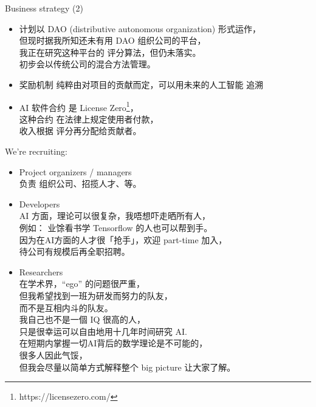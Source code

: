 \documentclass[10pt]{beamer}
\newcommand{\emp}[1]{{\color{blue}#1}}
\begin{document}
\begin{frame}
\vspace*{2em}
{\color{blue} \Large Business strategy (2)}
\vspace*{1em}
\begin{itemize}
	\item 计划以 \emp{DAO (distributive autonomous organization)} 形式运作，\\
			但现时据我所知还未有用 DAO 组织公司的平台， \\
			我正在研究这种平台的 \emp{评分算法}，但仍未落实。 \\
			初步会以传统公司的混合方法管理。
	\item 奖励机制 纯粹由对项目的贡献而定，可以用未来的人工智能 \emp{追溯}
	\item AI 软件合约 是 \emp{License Zero}\footnote{https://licensezero.com/}，\\
			这种合约 在法律上规定使用者付款，\\
			收入根据 评分再分配给贡献者。
\end{itemize}
\end{frame}


\begin{frame}
\vspace*{2em}
{\color{blue} \Large We're recruiting:}
\vspace*{1em}
\begin{itemize}
	\item \emp{Project organizers / managers} \\
		负责 组织公司、招揽人才、等。
	\item \emp{Developers} \\
		AI 方面，理论可以很复杂，我唔想吓走晒所有人，\\
		例如： 业馀看书学 Tensorflow 的人也可以帮到手。 \\
		因为在AI方面的人才很「抢手」，欢迎 part-time 加入，\\
		待公司有规模后再全职招聘。
	\item \emp{Researchers} \\
		在学术界，``ego'' 的问题很严重， \\
		但我希望找到一班为研发而努力的队友，\\
		而不是互相内斗的队友。\\
		我自己也不是一個 IQ 很高的人，\\
		只是很幸运可以自由地用十几年时间研究 AI. \\
		在短期内掌握一切AI背后的数学理论是不可能的，\\
		很多人因此气馁，\\
		但我会尽量以简单方式解释整个 big picture 让大家了解。 
\end{itemize}
\end{frame}
\end{document}
